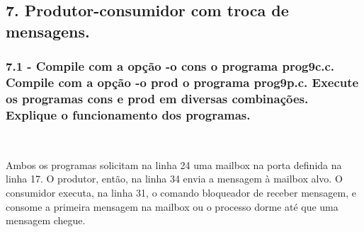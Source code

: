 \subsection*{7. Produtor-consumidor com troca de mensagens.}

\subsubsection{7.1 - Compile com a opção -o cons o programa prog9c.c. Compile com a opção -o prod o programa prog9p.c. Execute os programas cons e prod em diversas combinações. Explique o funcionamento dos programas.}

\vspace{-0.5em}
\begin{minipage}{\textwidth}
    \hspace{1em}
    \centering
    \begin{minipage}[t]{0.475\textwidth}
        \centering
        
        \label{prog4mod}
    \end{minipage}
    \hfill
    \begin{minipage}[t]{0.475\textwidth}
        \centering
        
        \label{prog4mod}
    \end{minipage}
    \hspace{1em}
    \\[-3pt]
    \hspace{1em}
    \begin{minipage}[t]{.475\linewidth}
        \centering
    \end{minipage}%
    \hfill%
    \begin{minipage}[t]{.475\linewidth}
        \centering
    \end{minipage}%
    \hspace{1em}
\end{minipage}
\vspace{1em}

Ambos os programas solicitam na linha 24 uma mailbox na porta definida na linha 17. O produtor, então, na linha 34 envia a mensagem à mailbox alvo. O consumidor executa, na linha 31, o comando bloqueador de receber mensagem, e consome a primeira mensagem na mailbox ou o processo dorme até que uma mensagem chegue.

